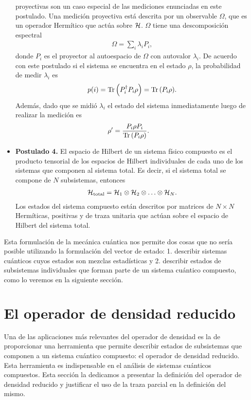 \begin{itemize}
	proyectivas son un caso especial de las mediciones enunciadas en
	este postulado.
	Una medición proyectiva está descrita por un observable
	$\Omega$, que es un operador Hermítico que actúa sobre $\mathcal{H}$. 
	$\Omega$ tiene una descomposición espectral \cite{nielsen_chuang_2011}
	\begin{align}
		\Omega = \sum _i \lambda_iP_i,
	\end{align}
	donde $P_i$ es el proyector al autoespacio de $\Omega$ 
	con autovalor $\lambda_i$.
	De acuerdo con este postulado si el sistema se encuentra en el estado
	$\rho$, la probabilidad de medir $\lambda_i$ es
	\begin{align}
		p(i) = \Tr \qty(P_i^{\dagger}P_i\rho) = \Tr \qty(P_i\rho).
	\end{align}
	Además, dado que se midió $\lambda_i$ el estado del sistema inmediatamente 
	luego de realizar la medición es 
	\begin{align}
		\rho'&=\frac{P_i\rho P_i}{\Tr \qty(P_i \rho)}.
	\end{align}
	\item[] \textbf{Postulado 4.} El espacio de Hilbert de un sistema físico 
	compuesto es el producto tensorial de los espacios de Hilbert 
	individuales de cada uno de los sistemas que componen al sistema total.
	Es decir, si el sistema total se compone de $N$ subsistemas, entonces
	\begin{align}
		\mathcal{H}_{\text{total}} = \mathcal{H}_1\otimes \mathcal{H}_2 \otimes \ldots \otimes \mathcal{H}_N.
	\end{align}
	Los estados del sistema compuesto están descritos por matrices de 
$N\times N$ Hermíticas, positivas y de traza unitaria que actúan 
sobre el espacio de Hilbert del sistema total.
\end{itemize}

Esta formulación de la mecánica cuántica nos permite 
dos cosas que no sería posible utilizando la formulación del 
vector de estado:
1. describir sistemas cuánticos cuyos estados son mezclas estadísticas y
2. describir estados de subsistemas individuales que forman parte de 
un sistema cuántico compuesto, como lo veremos
en la siguiente sección. 

\section{El operador de densidad reducido} %
Una de las aplicaciones más relevantes del operador de densidad es  
la de proporcionar una herramienta que permite
describir estados de subsistemas que componen a un sistema
cuántico compuesto: el operador de
densidad reducido. Esta herramienta es indispensable en el 
análisis de sistemas cuánticos compuestos. Esta sección la 
dedicamos a presentar la definición del operador de densidad reducido
y justificar el uso de la traza parcial en la definición del mismo.

